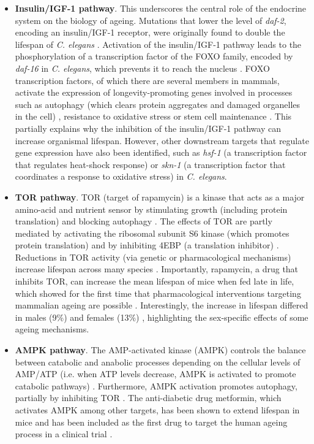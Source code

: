 \begin{itemize} 

	\item \textbf{Insulin/\acrshort{IGF-1} pathway}. This underscores the central role of the endocrine system on the biology of ageing. Mutations that lower the level of \textit{daf-2}, encoding an insulin/IGF-1 receptor, were originally found to double the lifespan of \textit{C. elegans} \cite{Kenyon1993,Guarente2000}. Activation of the insulin/IGF-1 pathway leads to the phosphorylation of a transcription factor of the FOXO family, encoded by \textit{daf-16} in \textit{C. elegans}, which prevents it to reach the nucleus \cite{Lin2001}. FOXO transcription factors, of which there are several members in mammals, activate the expression of longevity-promoting genes involved in processes such as autophagy (which clears protein aggregates and damaged organelles in the cell) \cite{Singh2019}, resistance to oxidative stress or stem cell maintenance \cite{Martins2016}. This partially explains why the inhibition of the insulin/IGF-1 pathway can increase organismal lifespan. However, other downstream targets that regulate gene expression have also been identified, such as \textit{hsf-1} (a transcription factor that regulates heat-shock response) \cite{Hsu2003} or \textit{skn-1} (a transcription factor that coordinates a response to oxidative stress) \cite{Tullet2008} in \textit{C. elegans}.
	
	\item \textbf{\acrshort{TOR} pathway}. \acrshort{TOR} (target of rapamycin) is a kinase that acts as a major amino-acid and nutrient sensor by stimulating growth (including protein translation) and blocking autophagy \cite{Kenyon2010}. The effects of TOR are partly mediated by activating the ribosomal subunit S6 kinase (which promotes protein translation) and by inhibiting 4EBP (a translation inhibitor)  \cite{Kenyon2010,Um2006}. Reductions in TOR activity (via genetic or pharmacological mechanisms) increase lifespan across many species \cite{Kenyon2010}. Importantly, rapamycin, a drug that inhibits TOR, can increase the mean lifespan of mice when fed late in life, which showed for the first time that pharmacological interventions targeting mammalian ageing are possible \cite{Harrison2009}. Interestingly, the increase in lifespan differed in males (9\%) and females (13\%) \cite{Harrison2009}, highlighting the sex-specific effects of some ageing mechanisms. 
	
	\item \textbf{AMPK pathway}. The AMP-activated kinase (\acrshort{AMPK}) controls the balance between catabolic and anabolic processes depending on the cellular levels of \acrshort{AMP}/\acrshort{ATP} (i.e. when ATP levels decrease, AMPK is activated to promote catabolic pathways) \cite{Kenyon2010,Mihaylova2011}. Furthermore, AMPK activation promotes autophagy, partially by inhibiting TOR \cite{Mihaylova2011}. The anti-diabetic drug metformin, which activates AMPK among other targets, has been shown to extend lifespan in mice \cite{Anisimov2008,Martin-Montalvo2013} and has been included as the first drug to target the human ageing process in a clinical trial \cite{Barzilai2016}.
		

\end{itemize}
